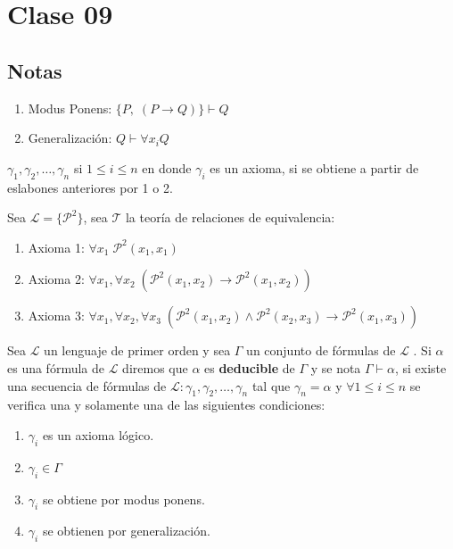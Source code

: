 \section{Clase 09}

\subsection{Notas}

\begin{enumerate}
	\item Modus Ponens: $\{P, \; (P \rightarrow Q) \} \vdash Q$
	\item Generalizaci\'on: $Q \vdash \forall x_i Q$
\end{enumerate}

$\gamma_1, \gamma_2, \ldots, \gamma_n$ si $1 \leq i \leq n$ en donde $\gamma_i$ es un axioma, si se obtiene a partir de eslabones anteriores por 1 o 2.

Sea $\mathcal{L} = \{ \mathcal{P}^2 \}$, sea $\mathcal{T}$ la teor\'ia de relaciones de equivalencia:

\begin{enumerate}
	\item Axioma 1: $\forall x_1 \; \mathcal{P}^2(x_1, x_1)$
	\item Axioma 2: $\forall x_1, \forall x_2 \; ( \mathcal{P}^2(x_1, x_2) \rightarrow \mathcal{P}^2(x_1, x_2))$
	\item Axioma 3: $\forall x_1, \forall x_2, \forall x_3 \; (\mathcal{P}^2(x_1, x_2) \land \mathcal{P}^2(x_2, x_3) \rightarrow \mathcal{P}^2(x_1, x_3))$
\end{enumerate}

\begin{definition}
Sea $\mathcal{L}$ un lenguaje de primer orden y sea $\Gamma$ un conjunto de f\'ormulas de $\mathcal{L}$ . Si $\alpha$ es una f\'ormula de $\mathcal{L}$ diremos que $\alpha$ es \textbf{deducible} de $\Gamma$ y se nota $\Gamma \vdash \alpha$, si existe una secuencia de f\'ormulas de $\mathcal{L} \colon \gamma_1, \gamma_2, \ldots, \gamma_n$ tal que $\gamma_n = \alpha$ y $\forall 1 \leq i \leq n$ se verifica una y solamente una de las siguientes condiciones:

\begin{enumerate}
	\item $\gamma_i$ es un axioma l\'ogico.
	\item $\gamma_i \in \Gamma$ 
	\item $\gamma_i$ se obtiene por modus ponens.
	\item $\gamma_i$ se obtienen por generalizaci\'on.
\end{enumerate}
\end{definition}

